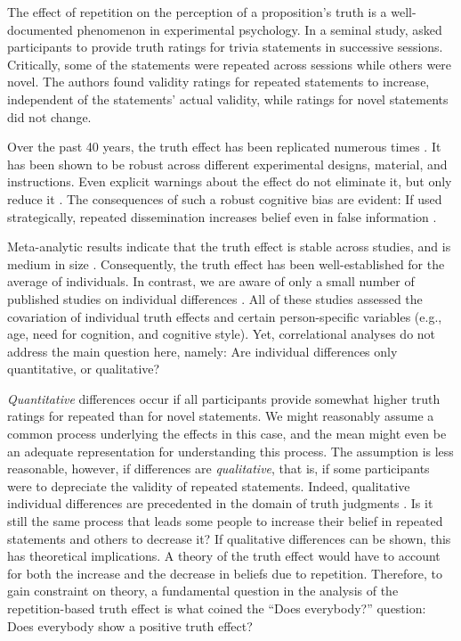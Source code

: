 \documentclass[
  english,
  ,man,floatsintext]{apa6}
\begin{document}
The effect of repetition on the perception of a proposition's truth is a well-documented phenomenon in experimental psychology. In a seminal study, \textcite{hasher1977} asked participants to provide truth ratings for trivia statements in successive sessions. Critically, some of the statements were repeated across sessions while others were novel. The authors found validity ratings for repeated statements to increase, independent of the statements' actual validity, while ratings for novel statements did not change.

Over the past 40 years, the truth effect has been replicated numerous times \autocite{dechene2010,unkelbach2019}. It has been shown to be robust across different experimental designs, material, and instructions. Even explicit warnings about the effect do not eliminate it, but only reduce it \autocite{nadarevic2017}. The consequences of such a robust cognitive bias are evident: If used strategically, repeated dissemination increases belief even in false information \autocite{unkelbach2019,lazer2018,pennycook2018}.

Meta-analytic results indicate that the truth effect is stable across studies, and is medium in size \autocite[Cohen's \(d \approx 0.50\);][]{dechene2010}. Consequently, the truth effect has been well-established for the average of individuals. In contrast, we are aware of only a small number of published studies on individual differences \autocite{arkes1991,boehm1994,brashier2017,dekeersmaecker2020,newman2020,parks2006}. All of these studies assessed the covariation of individual truth effects and certain person-specific variables (e.g., age, need for cognition, and cognitive style). Yet, correlational analyses do not address the main question here, namely: Are individual differences only quantitative, or qualitative?

\textit{Quantitative} differences occur if all participants provide somewhat higher truth ratings for repeated than for novel statements. We might reasonably assume a common process underlying the effects in this case, and the mean might even be an adequate representation for understanding this process. The assumption is less reasonable, however, if differences are \emph{qualitative}, that is, if some participants were to depreciate the validity of repeated statements. Indeed, qualitative individual differences are precedented in the domain of truth judgments \autocite[i.e., belief polarization;][]{cook2016}. Is it still the same process that leads some people to increase their belief in repeated statements and others to decrease it? If qualitative differences can be shown, this has theoretical implications. A theory of the truth effect would have to account for both the increase and the decrease in beliefs due to repetition. Therefore, to gain constraint on theory, a fundamental question in the analysis of the repetition-based truth effect is what \textcite{haaf2017} coined the ``Does everybody?'' question: Does everybody show a positive truth effect?
\end{document}
